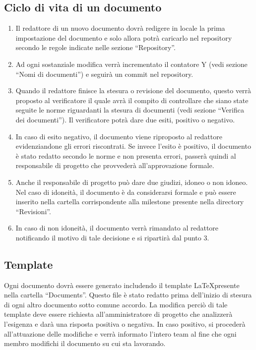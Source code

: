 \subsection{Ciclo di vita di un documento}
\begin{enumerate}
\item Il redattore di un nuovo documento dovrà redigere in locale la prima impostazione del documento e solo allora potrà caricarlo nel repository secondo le regole indicate nelle sezione ``Repository''.
\item Ad ogni sostanziale modifica verrà incrementato il contatore Y (vedi sezione ``Nomi di documenti'') e seguirà un commit nel repository.
\item Quando il redattore finisce la stesura o revisione del documento, questo verrà proposto al verificatore il quale avrà il compito di controllare che siano state seguite le norme riguardanti la stesura di documenti (vedi sezione ``Verifica dei documenti''). Il verificatore potrà dare due esiti, positivo o negativo.
\item
In caso di esito negativo, il documento viene riproposto al redattore evidenziandone gli errori riscontrati. Se invece l'esito è positivo, il documento è stato redatto secondo le norme e non presenta errori, passerà quindi al responsabile di progetto che provvederà all'approvazione formale.
\item Anche il responsabile di progetto può dare due giudizi, idoneo o non idoneo. Nel caso di idoneità, il documento è da considerarsi formale e può essere inserito nella cartella corrispondente alla milestone presente nella directory ``Revisioni''.
\item In caso di non idoneità, il documento verrà rimandato al redattore notificando il motivo di tale decisione e si ripartirà dal punto 3.
\end{enumerate}

\subsection{Template}
Ogni documento dovrà essere generato includendo il template \LaTeX presente nella cartella ``Documents''. Questo file è stato redatto prima dell'inizio di stesura di ogni altro documento sotto comune accordo. La modifica perciò di tale template deve essere richiesta all'amministratore di progetto che analizzerà l'esigenza e darà una risposta positiva o negativa. In caso positivo, si procederà all'attuazione delle modifiche e verrà informato l'intero team al fine che ogni membro modifichi il documento su cui sta lavorando.

